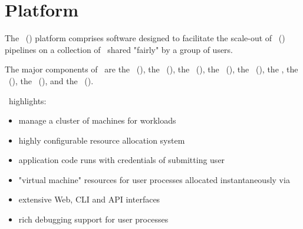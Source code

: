 
\newcommand{\varCompleted}{\texttt{Completed}}
\newcommand{\varReceived}{\texttt{Received}}

\newcommand{\varController}{\texttt{Controller}}

\newcommand{\varORmap}{\texttt{OR-map}}

\newcommand{\varProcessThreadCount}{\texttt{process\_thread\_count}}
\newcommand{\varNumberOfInstances}{\texttt{number\_of\_instances}}
\newcommand{\varSchedulingClass}{\texttt{scheduling\_class}}

\newcommand{\varDuccAdministrators}{\texttt{ducc.administrators}}

\newcommand{\varPID}{\texttt{PID}}


\newcommand{\varNull}{\textit{null}}
\newcommand{\varCGroups}{\textit{C-Groups}}


\newcommand{\varCollectionReader}{\textit{Collection Reader}}
\newcommand{\varCR}{\text{CR}}
\newcommand{\varAnalysisEngine}{\textit{Analysis Engine}}
\newcommand{\varAE}{\text{AE}}
\newcommand{\varJobProcess}{\textit{Job Process}}
\newcommand{\varJP}{\text{JP}}


\chapter{Platform}

    The \varDistributedUIMAClusterComputing~(\varDUCC) platform comprises software 
    designed to facilitate the scale-out of 
    \varUnstructuredInformationManagementArchitecture~(\varUIMA) pipelines on a 
    collection of \varNodesMachinesComputers~shared "fairly" by a group of users.
    
    The major components of \varDUCC~are the \varOrchestrator~(\varOR), the \varJobDriver~(\varJD), 
    the \varResourceManager~(\varRM), the \varProcessManager~(\varPM), the \varServicesManager~(\varSM), 
    the \varAgents, the \varCommandLineInterface~(\varCLI), the \varApplicationProgramInterface~(\varAPI), 
    and the \varWebServer~(\varWS).
    
    \varDUCC~highlights:
    \begin{itemize}
      \item manage a cluster of machines for \varUIMA workloads
      \item highly configurable resource allocation system
      \item application code runs with credentials of submitting user
      \item "virtual machine" resources for user processes allocated instantaneously via \varLinuxControlGroups
      \item extensive Web, CLI and API interfaces
      \item rich debugging support for user processes
    \end{itemize} 
    
